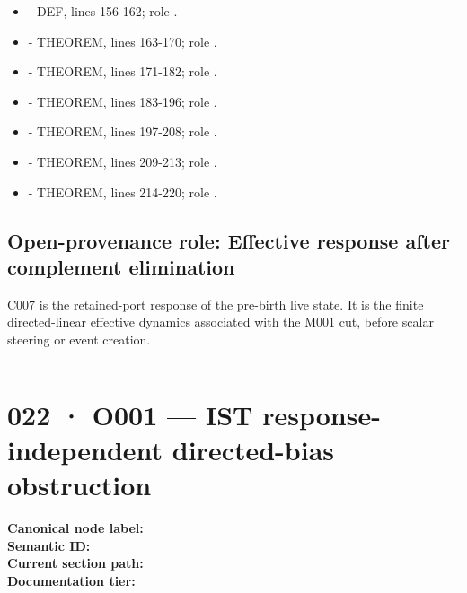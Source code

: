 \begin{itemize}
\item
  \texttt{\protect{}} - DEF, lines 156-162; role \texttt{\protect{}}.
\item
  \texttt{\protect{}} - THEOREM, lines 163-170; role
  \texttt{\protect{}}.
\item
  \texttt{\protect{}} - THEOREM, lines 171-182; role
  \texttt{\protect{}}.
\item
  \texttt{\protect{}} - THEOREM, lines 183-196; role
  \texttt{\protect{}}.
\item
  \texttt{\protect{}} - THEOREM, lines 197-208; role
  \texttt{\protect{}}.
\item
  \texttt{\protect{}} - THEOREM, lines 209-213;
  role \texttt{\protect{}}.
\item
  \texttt{\protect{}} - THEOREM, lines 214-220;
  role \texttt{\protect{}}.
\end{itemize}

\subsection{Open-provenance role: Effective response after complement
elimination}\label{open-provenance-role-effective-response-after-complement-elimination}

C007 is the retained-port response of the pre-birth live state. It is
the finite directed-linear effective dynamics associated with the M001
cut, before scalar steering or event creation.

\begin{center}\rule{0.5\linewidth}{0.5pt}\end{center}

\section{022 · O001 --- IST response-independent directed-bias
obstruction}\label{o001-ist-response-independent-directed-bias-obstruction}

\textbf{Canonical node label:} \texttt{\protect{}}\\
\textbf{Semantic ID:} \texttt{\protect{}}\\
\textbf{Current section path:} \texttt{\protect{}}\\
\textbf{Documentation tier:} \texttt{\protect{}}

